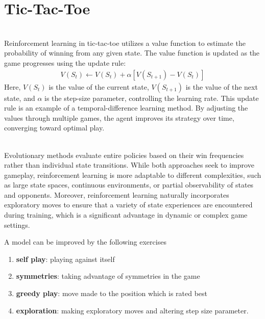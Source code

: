 \documentclass{article}
\begin{document}
\section{Tic-Tac-Toe}
\begin{paragraph}
\\
Reinforcement learning in tic-tac-toe utilizes a value function to estimate the probability of winning from any given state. The value function is updated as the game progresses using the update rule:
\begin{align*}
    V(S_t) \leftarrow V(S_t) + \alpha [V(S_{t+1}) - V(S_t)]
\end{align*}
Here, $V(S_t)$ is the value of the current state, $V(S_{t+1})$ is the value of the next state, and $\alpha$ is the step-size parameter, controlling the learning rate. This update rule is an example of a temporal-difference learning
method. By adjusting the values through multiple games, the agent improves its strategy over time, converging toward optimal play.
\end{paragraph}
\begin{paragraph}
\\
Evolutionary methods evaluate entire policies based on their win frequencies rather than individual state transitions. While both approaches seek to improve gameplay, reinforcement learning is more adaptable to different complexities, such as large state spaces, continuous environments, or partial observability of states and opponents. Moreover, reinforcement learning naturally incorporates exploratory moves to ensure that a variety of state experiences are encountered during training, which is a significant advantage in dynamic or complex game settings.

A model can be improved by the following exercises
\begin{enumerate}
    \item \textbf{self play}: playing against itself
    \item \textbf{symmetries}: taking advantage of symmetries in the game
    \item \textbf{greedy play}: move made to the position which is rated best
    \item \textbf{exploration}: making exploratory moves and altering step size parameter.
\end{enumerate}
\end{paragraph}
\end{document}
